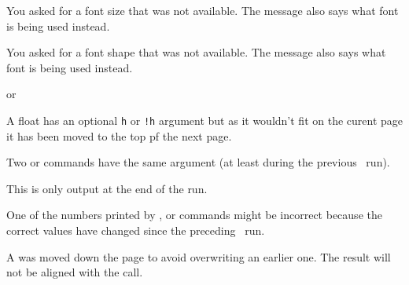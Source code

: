 \begin{plainlist}
\item[]

    You asked for a font size that was not available. The message also 
says what font is being used instead.

\item[]

    You asked for a font shape that was not available. The message also 
says what font is being used instead.


\item[]
    or 

    A float has an optional \texttt{h} or \texttt{!h} argument but
as it wouldn't fit on the curent page it has been moved to the top
pf the next page.





\item[]

    Two \cmd{\label} or \cmd{\bibitem} commands have the same argument
(at least during the previous \ltx\ run).

\item[]

    This is only output at the end of the run.

One of the numbers printed by \cmd{\cite}, \cmd{\ref}
or \cmd{\pageref} commands might be incorrect because the correct values
have changed since the preceding \ltx\ run.



\item[]

    A \cmd{\marginpar} was moved down the page to avoid overwriting an earlier
one. The result will not be aligned with the \cmd{\marginpar} call.


\end{plainlist}
